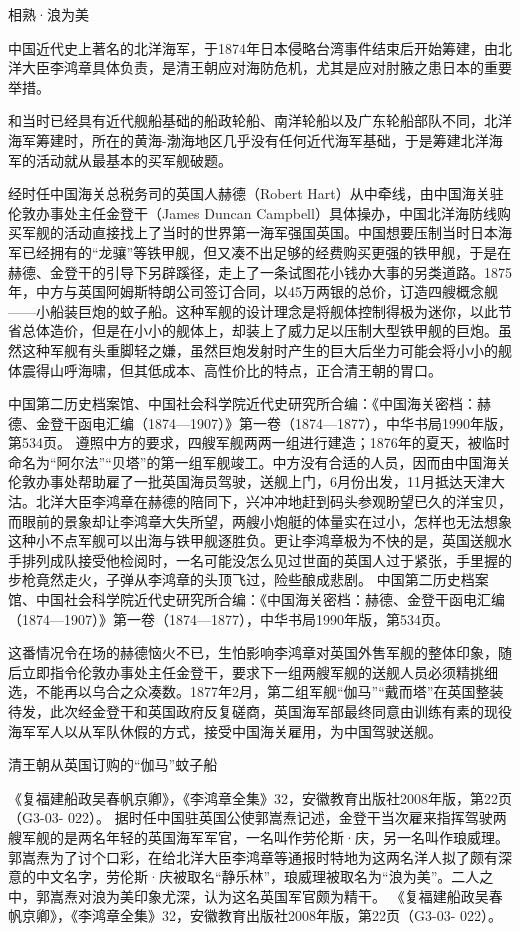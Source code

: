 \documentclass[12pt,UTF8]{ctexbook}
\begin{document}
相熟·浪为美

中国近代史上著名的北洋海军，于1874年日本侵略台湾事件结束后开始筹建，由北洋大臣李鸿章具体负责，是清王朝应对海防危机，尤其是应对肘腋之患日本的重要举措。

和当时已经具有近代舰船基础的船政轮船、南洋轮船以及广东轮船部队不同，北洋海军筹建时，所在的黄海-渤海地区几乎没有任何近代海军基础，于是筹建北洋海军的活动就从最基本的买军舰破题。

经时任中国海关总税务司的英国人赫德（Robert Hart）从中牵线，由中国海关驻伦敦办事处主任金登干（James Duncan Campbell）具体操办，中国北洋海防线购买军舰的活动直接找上了当时的世界第一海军强国英国。中国想要压制当时日本海军已经拥有的“龙骧”等铁甲舰，但又凑不出足够的经费购买更强的铁甲舰，于是在赫德、金登干的引导下另辟蹊径，走上了一条试图花小钱办大事的另类道路。1875年，中方与英国阿姆斯特朗公司签订合同，以45万两银的总价，订造四艘概念舰——小船装巨炮的蚊子船。这种军舰的设计理念是将舰体控制得极为迷你，以此节省总体造价，但是在小小的舰体上，却装上了威力足以压制大型铁甲舰的巨炮。虽然这种军舰有头重脚轻之嫌，虽然巨炮发射时产生的巨大后坐力可能会将小小的舰体震得山呼海啸，但其低成本、高性价比的特点，正合清王朝的胃口。

中国第二历史档案馆、中国社会科学院近代史研究所合编：《中国海关密档：赫德、金登干函电汇编（1874—1907）》第一卷（1874—1877），中华书局1990年版，第534页。
遵照中方的要求，四艘军舰两两一组进行建造；1876年的夏天，被临时命名为“阿尔法”“贝塔”的第一组军舰竣工。中方没有合适的人员，因而由中国海关伦敦办事处帮助雇了一批英国海员驾驶，送舰上门，6月份出发，11月抵达天津大沽。北洋大臣李鸿章在赫德的陪同下，兴冲冲地赶到码头参观盼望已久的洋宝贝，而眼前的景象却让李鸿章大失所望，两艘小炮艇的体量实在过小，怎样也无法想象这种小不点军舰可以出海与铁甲舰逐胜负。更让李鸿章极为不快的是，英国送舰水手排列成队接受他检阅时，一名可能没怎么见过世面的英国人过于紧张，手里握的步枪竟然走火，子弹从李鸿章的头顶飞过，险些酿成悲剧。 中国第二历史档案馆、中国社会科学院近代史研究所合编：《中国海关密档：赫德、金登干函电汇编（1874—1907）》第一卷（1874—1877），中华书局1990年版，第534页。

这番情况令在场的赫德恼火不已，生怕影响李鸿章对英国外售军舰的整体印象，随后立即指令伦敦办事处主任金登干，要求下一组两艘军舰的送舰人员必须精挑细选，不能再以乌合之众凑数。1877年2月，第二组军舰“伽马”“戴而塔”在英国整装待发，此次经金登干和英国政府反复磋商，英国海军部最终同意由训练有素的现役海军军人以从军队休假的方式，接受中国海关雇用，为中国驾驶送舰。


清王朝从英国订购的“伽马”蚊子船

《复福建船政吴春帆京卿》，《李鸿章全集》32，安徽教育出版社2008年版，第22页（G3-03- 022）。
据时任中国驻英国公使郭嵩焘记述，金登干当次雇来指挥驾驶两艘军舰的是两名年轻的英国海军军官，一名叫作劳伦斯·庆，另一名叫作琅威理。郭嵩焘为了讨个口彩，在给北洋大臣李鸿章等通报时特地为这两名洋人拟了颇有深意的中文名字，劳伦斯·庆被取名“静乐林”，琅威理被取名为“浪为美”。二人之中，郭嵩焘对浪为美印象尤深，认为这名英国军官颇为精干。 《复福建船政吴春帆京卿》，《李鸿章全集》32，安徽教育出版社2008年版，第22页（G3-03- 022）。
\end{document}
